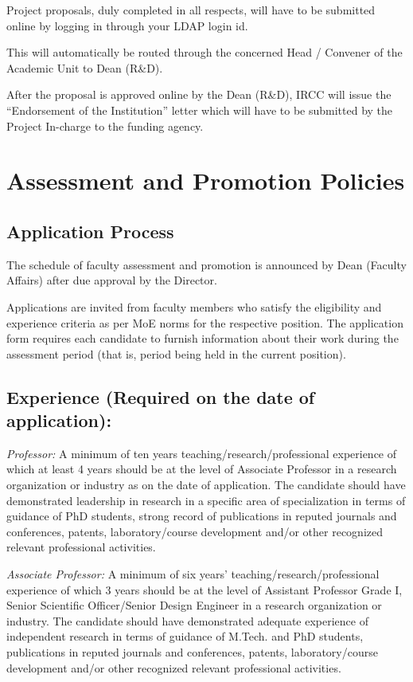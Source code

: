 \documentclass[
  10pt,
  a5paper,
  10pt,
  openany]{amsbook}
\begin{document}
Project proposals, duly completed in all respects, will have to be
submitted online by logging in through your LDAP login id.

This will automatically be routed through the concerned Head / Convener
of the Academic Unit to Dean (R\&D).

After the proposal is approved online by the Dean (R\&D), IRCC will
issue the ``Endorsement of the Institution'' letter which will have to
be submitted by the Project In-charge to the funding agency.

\chapter{Assessment and Promotion
Policies}\label{assessment-and-promotion-policies}

\section{Application Process}\label{application-process}

The schedule of faculty assessment and promotion is announced by Dean
(Faculty Affairs) after due approval by the Director.

Applications are invited from faculty members who satisfy the
eligibility and experience criteria as per MoE norms for the respective
position. The application form requires each candidate to furnish
information about their work during the assessment period (that is,
period being held in the current position).

\section{Experience (Required on the date of
application):}\label{experience-required-on-the-date-of-application}

\emph{Professor:} A minimum of ten years teaching/research/professional
experience of which at least 4 years should be at the level of Associate
Professor in a research organization or industry as on the date of
application. The candidate should have demonstrated leadership in
research in a specific area of specialization in terms of guidance of
PhD students, strong record of publications in reputed journals and
conferences, patents, laboratory/course development and/or other
recognized relevant professional activities.

\emph{Associate Professor:} A minimum of six years'
teaching/research/professional experience of which 3 years should be at
the level of Assistant Professor Grade I, Senior Scientific
Officer/Senior Design Engineer in a research organization or industry.
The candidate should have demonstrated adequate experience of
independent research in terms of guidance of M.Tech. and PhD students,
publications in reputed journals and conferences, patents,
laboratory/course development and/or other recognized relevant
professional activities.
\end{document}
